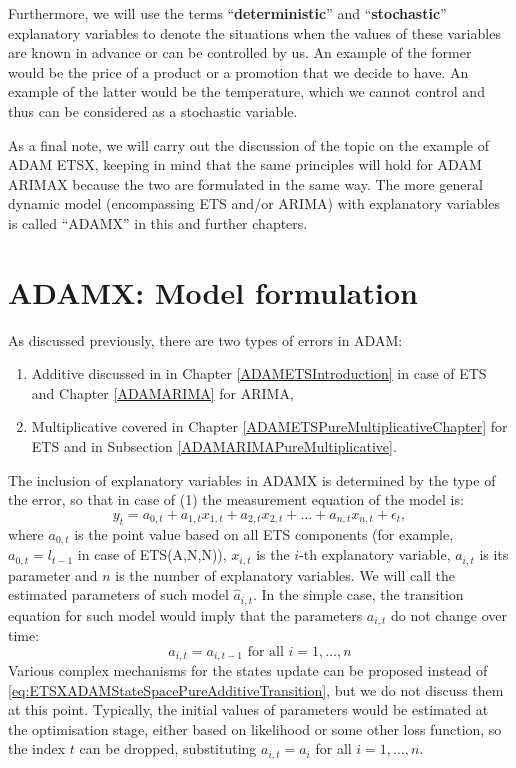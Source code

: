 \documentclass[
]{book}
\providecommand{\tightlist}{%
  \setlength{\itemsep}{0pt}\setlength{\parskip}{0pt}}
\theoremstyle{definition}
\theoremstyle{definition}
\theoremstyle{definition}
\theoremstyle{definition}
\theoremstyle{remark}
\begin{document}
Furthermore, we will use the terms ``\textbf{deterministic}'' and ``\textbf{stochastic}'' explanatory variables to denote the situations when the values of these variables are known in advance or can be controlled by us. An example of the former would be the price of a product or a promotion that we decide to have. An example of the latter would be the temperature, which we cannot control and thus can be considered as a stochastic variable.

As a final note, we will carry out the discussion of the topic on the example of ADAM ETSX, keeping in mind that the same principles will hold for ADAM ARIMAX because the two are formulated in the same way. The more general dynamic model (encompassing ETS and/or ARIMA) with explanatory variables is called ``ADAMX'' in this and further chapters.

\hypertarget{ADAMXFormulation}{%
\section{ADAMX: Model formulation}\label{ADAMXFormulation}}

As discussed previously, there are two types of errors in ADAM:

\begin{enumerate}
\def\labelenumi{\arabic{enumi}.}
\tightlist
\item
  Additive discussed in \citet{Hyndman2008b} in Chapter \ref{ADAMETSIntroduction} in case of ETS and Chapter \ref{ADAMARIMA} for ARIMA,
\item
  Multiplicative covered in Chapter \ref{ADAMETSPureMultiplicativeChapter} for ETS and in Subsection \ref{ADAMARIMAPureMultiplicative}.
\end{enumerate}

The inclusion of explanatory variables in ADAMX is determined by the type of the error, so that in case of (1) the measurement equation of the model is:
\begin{equation}
  {y}_{t} = a_{0,t} + a_{1,t} x_{1,t} + a_{2,t} x_{2,t} + \dots + a_{n,t} x_{n,t} + \epsilon_t ,
  \label{eq:ETSXADAMStateSpacePureAdditiveMeasurement}
\end{equation}
where \(a_{0,t}\) is the point value based on all ETS components (for example, \(a_{0,t}=l_{t-1}\) in case of ETS(A,N,N)), \(x_{i,t}\) is the \(i\)-th explanatory variable, \(a_{i,t}\) is its parameter and \(n\) is the number of explanatory variables. We will call the estimated parameters of such model \(\hat{a}_{i,t}\). In the simple case, the transition equation for such model would imply that the parameters \(a_{i,t}\) do not change over time:
\begin{equation}
    a_{i,t} = a_{i,t-1} \text{ for all } i = 1, \dots, n
  \label{eq:ETSXADAMStateSpacePureAdditiveTransition}
\end{equation}
Various complex mechanisms for the states update can be proposed instead of \eqref{eq:ETSXADAMStateSpacePureAdditiveTransition}, but we do not discuss them at this point. Typically, the initial values of parameters would be estimated at the optimisation stage, either based on likelihood or some other loss function, so the index \(t\) can be dropped, substituting \(a_{i,t}=a_{i}\) for all \(i=1,\dots,n\).
\end{document}

